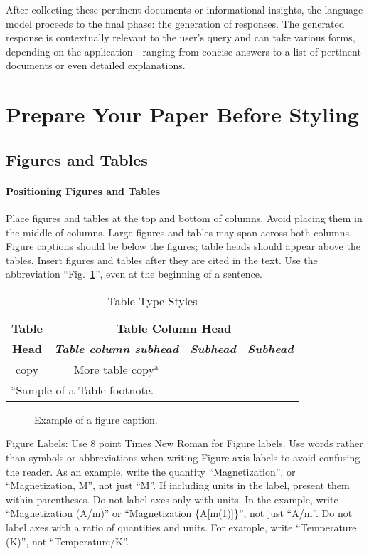 \documentclass[conference]{IEEEtran}
\begin{document}
After collecting these pertinent documents or informational insights, the language model proceeds to the final phase: the generation of responses. The generated response is contextually relevant to the user's query and can take various forms, depending on the application—ranging from concise answers to a list of pertinent documents or even detailed explanations.



\section{Prepare Your Paper Before Styling}

\subsection{Figures and Tables}
\paragraph{Positioning Figures and Tables} Place figures and tables at the top and 
bottom of columns. Avoid placing them in the middle of columns. Large 
figures and tables may span across both columns. Figure captions should be 
below the figures; table heads should appear above the tables. Insert 
figures and tables after they are cited in the text. Use the abbreviation 
``Fig.~\ref{fig}'', even at the beginning of a sentence.

\begin{table}[htbp]
\caption{Table Type Styles}
\begin{center}
\begin{tabular}{|c|c|c|c|}
\hline
\textbf{Table}&\multicolumn{3}{|c|}{\textbf{Table Column Head}} \\
\cline{2-4} 
\textbf{Head} & \textbf{\textit{Table column subhead}}& \textbf{\textit{Subhead}}& \textbf{\textit{Subhead}} \\
\hline
copy& More table copy$^{\mathrm{a}}$& &  \\
\hline
\multicolumn{4}{l}{$^{\mathrm{a}}$Sample of a Table footnote.}
\end{tabular}
\label{tab1}
\end{center}
\end{table}

\begin{figure}[htbp]
\caption{Example of a figure caption.}
\label{fig}
\end{figure}

Figure Labels: Use 8 point Times New Roman for Figure labels. Use words 
rather than symbols or abbreviations when writing Figure axis labels to 
avoid confusing the reader. As an example, write the quantity 
``Magnetization'', or ``Magnetization, M'', not just ``M''. If including 
units in the label, present them within parentheses. Do not label axes only 
with units. In the example, write ``Magnetization (A/m)'' or ``Magnetization 
\{A[m(1)]\}'', not just ``A/m''. Do not label axes with a ratio of 
quantities and units. For example, write ``Temperature (K)'', not 
``Temperature/K''.
\end{document}
